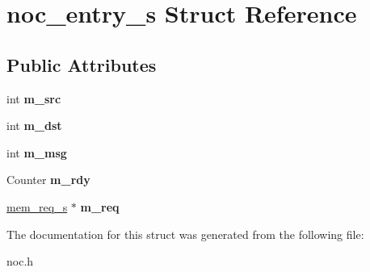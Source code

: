 \hypertarget{structnoc__entry__s}{
\section{noc\_\-entry\_\-s Struct Reference}
\label{structnoc__entry__s}
}
\subsection*{Public Attributes}
\begin{DoxyCompactItemize}
\item 
\hypertarget{structnoc__entry__s_af8123088800fffd9ce505118436fcee8}{
int {\bfseries m\_\-src}}
\label{structnoc__entry__s_af8123088800fffd9ce505118436fcee8}

\item 
\hypertarget{structnoc__entry__s_a2904d8ce5478f5b7b9050e41b722ff42}{
int {\bfseries m\_\-dst}}
\label{structnoc__entry__s_a2904d8ce5478f5b7b9050e41b722ff42}

\item 
\hypertarget{structnoc__entry__s_a24e1182379a29649d6cb8ffb9bb65d9c}{
int {\bfseries m\_\-msg}}
\label{structnoc__entry__s_a24e1182379a29649d6cb8ffb9bb65d9c}

\item 
\hypertarget{structnoc__entry__s_a4472a1f9a73e12ce2fedb260ed5b5bf7}{
Counter {\bfseries m\_\-rdy}}
\label{structnoc__entry__s_a4472a1f9a73e12ce2fedb260ed5b5bf7}

\item 
\hypertarget{structnoc__entry__s_ab464d97cf14dfafbac20045c9609b13c}{
\hyperlink{structmem__req__s}{mem\_\-req\_\-s} $\ast$ {\bfseries m\_\-req}}
\label{structnoc__entry__s_ab464d97cf14dfafbac20045c9609b13c}

\end{DoxyCompactItemize}


The documentation for this struct was generated from the following file:\begin{DoxyCompactItemize}
\item 
noc.h\end{DoxyCompactItemize}

